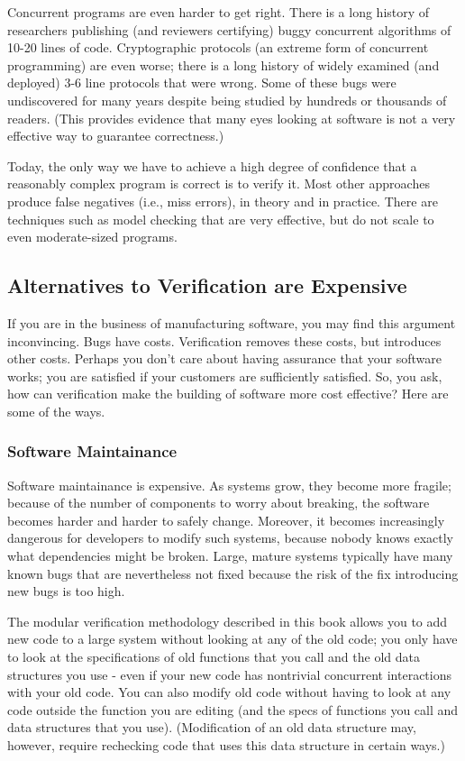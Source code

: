 \documentclass{report}
\newcommand{\Todo}[1]{\marginpar{#1}}
\begin{document}
Concurrent programs are even harder to get right. There is a long
history of researchers publishing (and reviewers certifying) buggy
concurrent algorithms of 10-20 lines of code. Cryptographic protocols
(an extreme form of concurrent programming) are even worse; there is a
long history of widely examined (and deployed) 3-6 line protocols that
were wrong. Some of these bugs were undiscovered for many years
despite being studied by hundreds or thousands of readers. (This
provides evidence that many eyes looking at software is not a very
effective way to guarantee correctness.)

Today, the only way we have to achieve a high degree of confidence
that a reasonably complex program is correct is to verify it.  Most
other approaches produce false negatives (i.e., miss errors),
in theory and in practice. There are techniques such as model checking
that are very effective, but do not scale to even moderate-sized
programs. \Todo{review of other techniques somewhere}

\subsection{Alternatives to Verification are Expensive}
If you are in the business of manufacturing software, you may find
this argument inconvincing. Bugs have costs. Verification removes
these costs, but introduces other costs. Perhaps you don't care about
having assurance that your software works; you are satisfied if your
customers are sufficiently satisfied. So, you ask, how can
verification make the building of software more cost effective?  Here
are some of the ways.


\subsubsection{Software Maintainance}
Software maintainance is expensive.  As systems grow, they become more
fragile; because of the number of components to worry about breaking,
the software becomes harder and harder to safely change. Moreover, it
becomes increasingly dangerous for developers to modify such systems,
because nobody knows exactly what dependencies might be broken. Large,
mature systems typically have many known bugs that are nevertheless
not fixed because the risk of the fix introducing new bugs is too
high.

The modular verification methodology described in this book allows you
to add new code to a large system without looking at any of the old
code; you only have to look at the specifications of old functions
that you call and the old data structures you use - even if your new
code has nontrivial concurrent interactions with your old code. You
can also modify old code without having to look at any code outside
the function you are editing (and the specs of functions you call and
data structures that you use). (Modification of an old data structure
may, however, require rechecking code that uses this data structure in
certain ways.)
\end{document}
